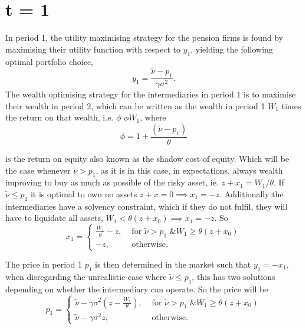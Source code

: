 \documentclass[11pt]{article}
\begin{document}
\section*{t = 1}
In period 1, the utility maximising strategy for the pension firms is found by maximising their utility function with respect to $y_1$, yielding the following optimal portfolio choice,
\begin{equation}
y_1 = \frac{\tilde{\nu} - p_1}{\gamma \sigma^2}.
\end{equation}
The wealth optimising strategy for the intermediaries in period 1 is to maximise their wealth in period 2, which can be written as the wealth in period 1 $W_1$ times the return on that wealth, i.e. $\phi$ $\phi W_1$, where
\begin{equation}
\phi = 1 + \frac{(\tilde{\nu} - p_1)}{\theta}
\end{equation}

is the return on equity also known as the shadow cost of equity. Which will be the case whenever $\tilde{\nu} > p_1$, as it is in this case, in expectations, always wealth improving to buy as much as possible of the risky asset, ie. $z + x_1 = W_1/\theta$. If $\tilde{\nu} \leq p_1$ it is optimal to own no assets $z+x = 0 \implies x_1 = -z$. Additionally the intermediaries have a solvency constraint, which if they do not fulfil, they will have to liquidate all assets, $W_1 < \theta(z+x_0) \implies x_1 = -z$. So
\begin{equation}
x_1 =
\begin{cases}
\frac{W_1}{\theta} - z, &\text{ for } \tilde{\nu} > p_1 \text{ \& } W_1 \geq \theta(z+x_0)\\
-z, &\text{ otherwise.}
\end{cases}
\end{equation}

The price in period 1 $p_1$ is then determined in the market such that $y_1 = - x_1$, when disregarding the unrealistic case where $\tilde{\nu} \leq p_1$, this has two solutions depending on whether the intermediary can operate. So the price will be
\begin{equation} \label{price1}
p_1 =
\begin{cases}
\tilde{\nu} - \gamma \sigma^2(z - \frac{W_1}{\theta}), &\text{ for } \tilde{\nu} > p_1 \text{ \& } W_1 \geq \theta(z+x_0)\\
\tilde{\nu} - \gamma \sigma^2 z, &\text{ otherwise}.
\end{cases}
\end{equation}
\end{document}
